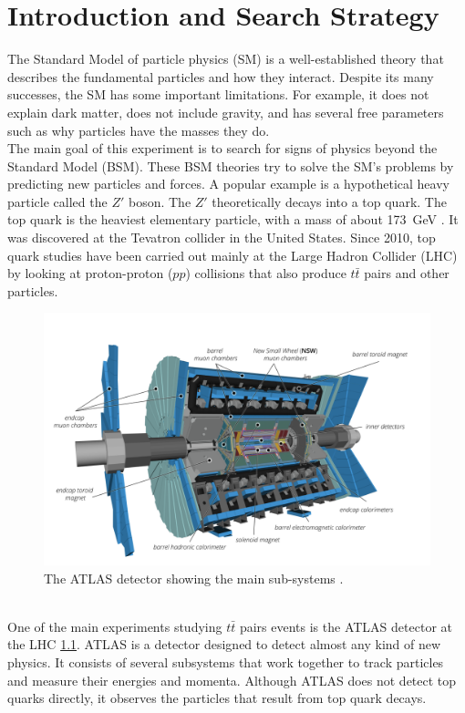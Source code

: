 \chapter{Introduction and Search Strategy}

The Standard Model of particle physics (SM) is a well-established theory that describes the fundamental particles and how they interact. Despite its many successes, the SM has some important limitations. For example, it does not explain dark matter, does not include gravity, and has several free parameters such as why particles have the masses they do.
\\

The main goal of this experiment is to search for signs of  physics beyond the Standard Model (BSM). These BSM theories try to solve the SM’s problems by predicting new particles and forces. A popular example is a hypothetical heavy particle called the \( Z' \) boson. The $Z'$ theoretically decays into a top quark. The top quark is the heaviest elementary particle, with a mass of about \SI{173}{GeV} \cite{Workman2022}. It was discovered at the Tevatron collider in the United States. Since 2010, top quark studies have been carried out mainly at the Large Hadron Collider (LHC) by looking at proton-proton (\( pp \)) collisions that also produce \( t\bar{t} \) pairs and other particles.
\\

\begin{figure}[H]
    \centering
    \includegraphics[width=0.6\linewidth]{Figure/atlas.png}
    \caption{The ATLAS detector showing the main sub-systems \cite{Aad2008}.}
    \label{atlas}
\end{figure}
\\

One of the main experiments studying \( t\bar{t} \) pairs events is the ATLAS detector at the LHC \ref{atlas}. ATLAS is a detector designed to detect almost any kind of new physics. It consists of several subsystems that work together to track particles and measure their energies and momenta. Although ATLAS does not detect top quarks directly, it observes the particles that result from top quark decays.
\\

